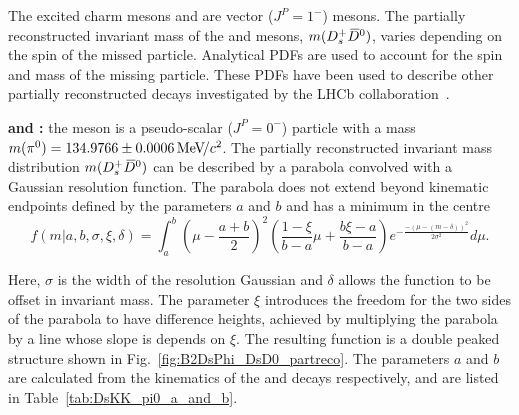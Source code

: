 The excited charm mesons \Dstarzb and  are vector ($J^{P} = 1^{-}$) mesons. The partially reconstructed invariant mass of the \Dsp and \Dzb mesons, $m({{D}^+_{s}}{{\kern 0.2em\overline{\kern -0.2em D}{}}{}^0})$, varies depending on the spin of the missed particle.
Analytical PDFs are used to account for the spin and mass of the missing particle. These PDFs have been used to describe other partially reconstructed  decays investigated by the LHCb collaboration~\cite{LHCb-PAPER-2017-021}. 

\begin{description}
\item \textbf{\decay{\Bp}{(\decay{\Dssp}{\Dsp[\piz]})\Dzb} and \decay{\Bp}{\Dsp(\decay{\Dstarzb}{\Dzb[\piz]})}:} the \piz meson is a pseudo-scalar ($J^{P} = 0^{-}$) particle with a mass $m({{\pi}^0}) = 134.9766 \pm 0.0006 {\mathrm{\,Me\kern -0.1em V\!/}c^2}$. The partially reconstructed invariant mass distribution $m({{D}^+_{s}}{{\kern 0.2em\overline{\kern -0.2em D}{}}{}^0})$ can be described by a parabola convolved with a Gaussian resolution function. The parabola does not extend beyond kinematic endpoints defined by the parameters $a$ and $b$ and has a minimum in the centre 
\begin{equation}
f(m|a,b,\sigma,\xi, \delta) = \int_{a}^{b}\left(\mu-\frac{a+b}{2}\right)^{2} \left( \frac{1-\xi}{b-a}\mu + \frac{b\xi-a}{b-a} \right) e^{-\frac{-(\mu-(m-\delta))^{2}}{2\sigma^{2}}} d\mu.
\end{equation} 

Here, $\sigma$ is the width of the resolution Gaussian and $\delta$ allows the function to be offset in invariant mass. The parameter $\xi$ introduces the freedom for the two sides of the parabola to have difference heights, achieved by multiplying the parabola by a line whose slope is depends on $\xi$. The resulting function is a double peaked structure shown in Fig.~\ref{fig:B2DsPhi_DsD0_partreco}.   
The parameters $a$ and $b$ are calculated from the kinematics of the \decay{\Bp}{(\decay{\Dssp}{\Dsp\piz})\Dzb} and \decay{\Bp}{\Dsp(\decay{\Dstarzb}{\Dzb\piz})} decays respectively, and are listed in Table~\ref{tab:DsKK_pi0_a_and_b}.

\end{description}

